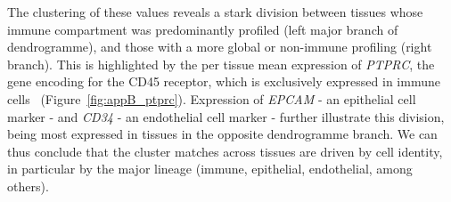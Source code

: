 The clustering of these values reveals a stark division between tissues whose immune compartment was predominantly profiled (left major branch of dendrogramme), and those with a more global or non-immune profiling (right branch). This is highlighted by the per tissue mean expression of \textit{PTPRC}, the gene encoding for the CD45 receptor, which is exclusively expressed in immune cells~\citep{altin_role_1997} (Figure~\ref{fig:appB_ptprc}). Expression of \textit{EPCAM} - an epithelial cell marker - and \textit{CD34} - an endothelial cell marker - further illustrate this division, being most expressed in tissues in the opposite dendrogramme branch. We can thus conclude that the cluster matches across tissues are driven by cell identity, in particular by the major lineage (immune, epithelial, endothelial, among others).

